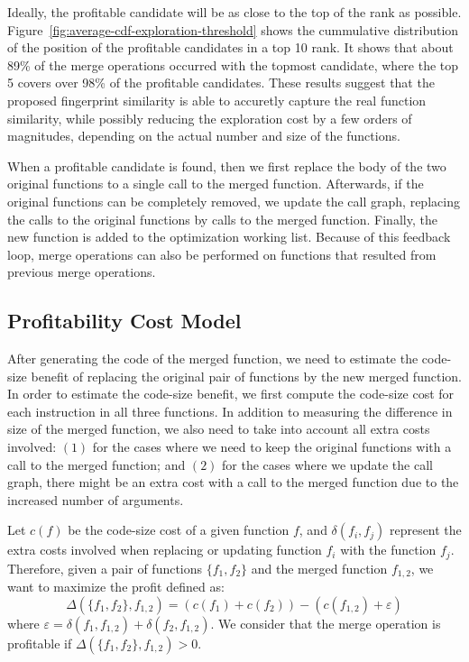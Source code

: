 Ideally, the profitable candidate will be as close to the top of the rank as
possible.
Figure~\ref{fig:average-cdf-exploration-threshold} shows the cummulative
distribution of the position of the profitable candidates in a top 10 rank.
It shows that about 89\% of the merge operations occurred with the topmost
candidate, where the top 5 covers over 98\% of the profitable candidates.
These results suggest that the proposed fingerprint similarity is able to
accuretly capture the real function similarity, while possibly reducing the
exploration cost by a few orders of magnitudes, depending on the actual number
and size of the functions.

When a profitable candidate is found, then we first replace the body of the two
original functions to a single call to the merged function.
Afterwards, if the original functions can be completely removed, we update the
call graph, replacing the calls to the original functions by calls to the
merged function.
Finally, the new function is added to the optimization working list.
Because of this feedback loop, merge operations can also be performed on
functions that resulted from previous merge operations.

\subsection{Profitability Cost Model}\label{sec:profit-model}

After generating the code of the merged function, we need to estimate the
code-size benefit of replacing the original pair of functions by the new merged
function.
In order to estimate the code-size benefit, we first compute the code-size cost
for each instruction in all three functions.
In addition to measuring the difference in size of the merged function, we also
need to take into account all extra costs involved:
$(1)$ for the cases where we need to keep the original functions with a call to
the merged function;
and $(2)$ for the cases where we update the call graph, there might be an extra
cost with a call to the merged function due to the increased number of arguments.

Let $c(f)$ be the code-size cost of a given function $f$, and
$\delta(f_i, f_j)$ represent the extra costs involved when replacing or
updating function $f_i$ with the function $f_j$.
Therefore, given a pair of functions $\{f_1,f_2\}$ and the merged function
$f_{1,2}$, we want to maximize the profit defined as:
\[
  \Delta(\{f_1,f_2\},f_{1,2}) = (c(f_1)+c(f_2)) - (c(f_{1,2}) + \varepsilon)
\]
where $\varepsilon = \delta(f_1, f_{1,2}) + \delta(f_2, f_{1,2})$.
We consider that the merge operation is profitable if $\Delta(\{f_1,f_2\},f_{1,2})>0$.

